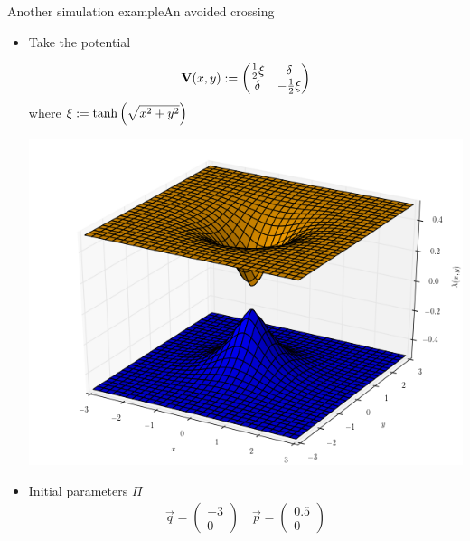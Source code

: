 \documentclass{beamer}
\begin{document}
\begin{frame}{Another simulation example}{An avoided crossing}
  \begin{itemize}
  \item Take the potential \\
    \begin{minipage}{0.6\linewidth}
      \begin{equation*}
        \mathbf{V}(x,y) :=
        \begin{pmatrix}
          \frac{1}{2} \xi & \delta \\
          \delta          & - \frac{1}{2} \xi
        \end{pmatrix}
      \end{equation*}
      where $\xi := \tanh{\left(\sqrt{x^2 + y^2} \right)}$
    \end{minipage}
    \begin{minipage}{0.3\linewidth}
      \begin{center}
        \includegraphics[scale=0.15]{./fig/delta_gap_rotsym.png}
      \end{center}
    \end{minipage}
  \item Initial parameters $\Pi$
    \begin{align*}
      \vec{q} = \begin{pmatrix}
        -3 \\ 0
      \end{pmatrix}
      \quad
      \vec{p} = \begin{pmatrix}
        0.5 \\ 0
      \end{pmatrix}

\end{align*}
\end{itemize}
\end{frame}
\end{document}
